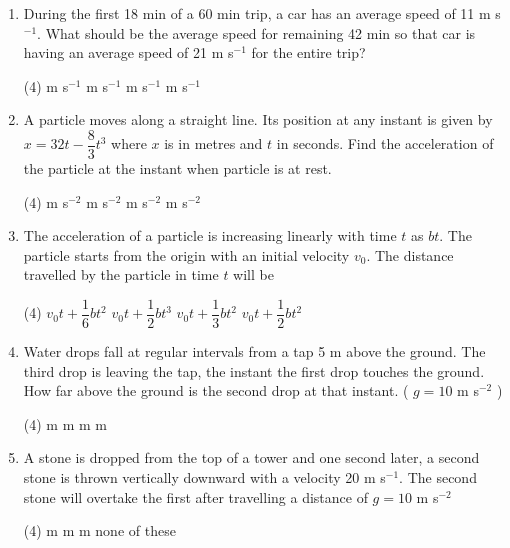 \documentclass{article}
\renewcommand{\frac}[2]{\dfrac{#1}{#2}}
\begin{document}
\begin{enumerate}
    \item During the first 18 min of a 60 min trip, a car has an average speed of 11 m s\(^{-1}\). What should be the average speed for remaining 42 min so that car is having an average speed of 21 m s\(^{-1}\) for the entire trip?
    \begin{tasks}(4)
         m s\(^{-1}\)
         m s\(^{-1}\)
         m s\(^{-1}\)
         m s\(^{-1}\)
    \end{tasks}
    \item A particle moves along a straight line. Its position at any instant is given by \( x = 32t - \frac{8}{3}t^3 \) where \( x \) is in metres and \( t \) in seconds. Find the acceleration of the particle at the instant when particle is at rest.
    \begin{tasks}(4)
         m s\(^{-2}\)
         m s\(^{-2}\)
         m s\(^{-2}\)
         m s\(^{-2}\)
    \end{tasks}
    \item The acceleration of a particle is increasing linearly with time \( t \) as \( bt \). The particle starts from the origin with an initial velocity \( v_0 \). The distance travelled by the particle in time \( t \) will be
    \begin{tasks}(4)
        \task \( v_0 t + \frac{1}{6}bt^2 \)
        \task \( v_0 t + \frac{1}{2}bt^3 \)
        \task \( v_0 t + \frac{1}{3}bt^2 \)
        \task \( v_0 t + \frac{1}{2}bt^2 \)
    \end{tasks}
    \item Water drops fall at regular intervals from a tap 5 m above the ground. The third drop is leaving the tap, the instant the first drop touches the ground. How far above the ground is the second drop at that instant. ( \( g = 10 \) m s\(^{-2}\) )
    \begin{tasks}(4)
         m
         m
         m
         m
    \end{tasks}
    \item A stone is dropped from the top of a tower and one second later, a second stone is thrown vertically downward with a velocity 20 m s\(^{-1}\). The second stone will overtake the first after travelling a distance of \( g = 10 \) m s\(^{-2}\)
    \begin{tasks}(4)
         m
         m
         m
        \task none of these
    \end{tasks}

\end{enumerate}
\end{document}
